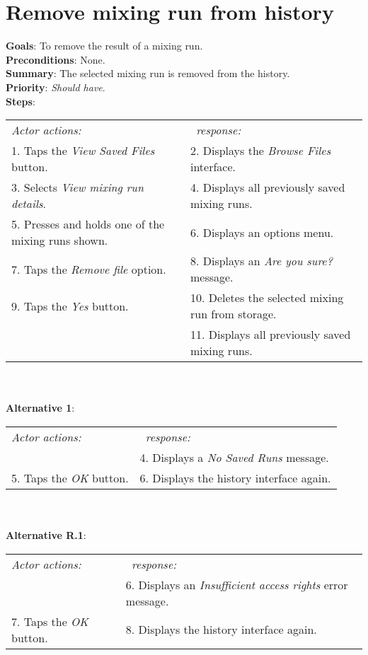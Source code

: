\section{Remove mixing run from history}
 \label{removemixrun}
  \textbf{Goals}: To remove the result of a mixing run.\\
  \textbf{Preconditions}: None.\\
  \textbf{Summary}: The selected mixing run is removed from the history.\\
  \textbf{Priority}: \emph{Should have}.\\
  \textbf{Steps}: \\
    \begin{tabular}{ p{} p{} }
  	\emph{Actor actions:} & \emph{\projectname\ response:} \\
    1. Taps the \emph{View Saved Files} button. & 2. Displays the \emph{Browse Files} interface.\\
    3. Selects \emph{View mixing run details}. & 4. Displays all previously saved mixing runs.\\
    5. Presses and holds one of the mixing runs shown. & 6. Displays an options menu. \\
    7. Taps the \emph{Remove file} option. & 8. Displays an \emph{Are you sure?} message.\\
    9. Taps the \emph{Yes} button. & 10. Deletes the selected mixing run from storage. \\
     & 11. Displays all previously saved mixing runs.
    \end{tabular}
            \\
     \\\textbf{Alternative 1}: \\
    \begin{tabular}{ p{} p{} }
  	\emph{Actor actions:} & \emph{\projectname\ response:} \\
            & 4. Displays a \emph{No Saved Runs} message. \\
    5. Taps the \emph{OK} button. & 6. Displays the history interface again. \\
    \end{tabular}
    \\
     \\\textbf{Alternative R.1}: \\
    \begin{tabular}{ p{} p{} }
  	\emph{Actor actions:} & \emph{\projectname\ response:} \\
            & 6. Displays an \emph{Insufficient access rights} error message. \\
    7. Taps the \emph{OK} button. & 8. Displays the history interface again. \\
    \end{tabular}
